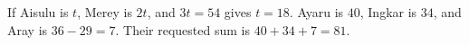 If Aisulu is $t$, Merey is $2t$, and $3t=54$ gives $t=18$. Ayaru is $40$, Ingkar is $34$, and Aray is $36-29=7$. Their requested sum is $40+34+7=\boxed{81}$.
